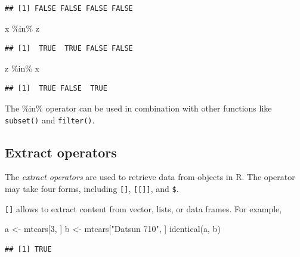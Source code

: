\documentclass[
  12pt,
  oneside]{book}
\newenvironment{Shaded}{\begin{snugshade}}{\end{snugshade}}
\newcommand{\DecValTok}[1]{\textcolor[rgb]{0.00,0.00,0.81}{#1}}
\newcommand{\FunctionTok}[1]{\textcolor[rgb]{0.00,0.00,0.00}{#1}}
\newcommand{\NormalTok}[1]{#1}
\newcommand{\OtherTok}[1]{\textcolor[rgb]{0.56,0.35,0.01}{#1}}
\newcommand{\SpecialCharTok}[1]{\textcolor[rgb]{0.00,0.00,0.00}{#1}}
\newcommand{\StringTok}[1]{\textcolor[rgb]{0.31,0.60,0.02}{#1}}
\theoremstyle{definition}
\theoremstyle{definition}
\theoremstyle{definition}
\theoremstyle{definition}
\theoremstyle{remark}
\begin{document}
\begin{verbatim}
## [1] FALSE FALSE FALSE FALSE
\end{verbatim}

\begin{Shaded}
\begin{Highlighting}[]
\NormalTok{x }\SpecialCharTok{\%in\%}\NormalTok{ z  }
\end{Highlighting}
\end{Shaded}

\begin{verbatim}
## [1]  TRUE  TRUE FALSE FALSE
\end{verbatim}

\begin{Shaded}
\begin{Highlighting}[]
\NormalTok{z }\SpecialCharTok{\%in\%}\NormalTok{ x}
\end{Highlighting}
\end{Shaded}

\begin{verbatim}
## [1]  TRUE FALSE  TRUE
\end{verbatim}

The \%in\% operator can be used in combination with other functions like \texttt{subset()} and \texttt{filter()}.

\hypertarget{extract-operators}{%
\subsection{Extract operators}\label{extract-operators}}

The \emph{extract operators} are used to retrieve data from objects in R. The operator may take four forms, including \texttt{{[}{]}}, \texttt{{[}{[}{]}{]}}, and \texttt{\$}.

\texttt{{[}{]}} allows to extract content from vector, lists, or data frames. For example,

\begin{Shaded}
\begin{Highlighting}[]
\NormalTok{a }\OtherTok{\textless{}{-}}\NormalTok{ mtcars[}\DecValTok{3}\NormalTok{, ]}
\NormalTok{b }\OtherTok{\textless{}{-}}\NormalTok{ mtcars[}\StringTok{"Datsun 710"}\NormalTok{, ]}
\FunctionTok{identical}\NormalTok{(a, b)}
\end{Highlighting}
\end{Shaded}

\begin{verbatim}
## [1] TRUE
\end{verbatim}
\end{document}
